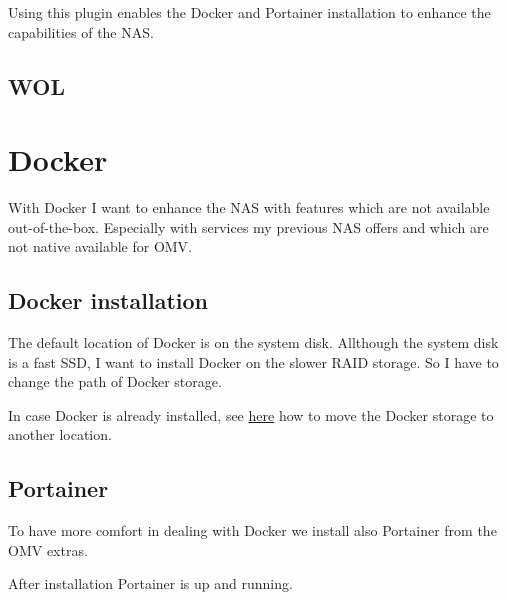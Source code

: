 Using this plugin enables the \gls{Docker} and \gls{Portainer} installation
to enhance the capabilities of the \gls{NAS}.


\subsection{WOL}


\section{Docker}

With \gls{Docker} I want to enhance the \gls{NAS} with features which are not
available out-of-the-box. Especially with services my previous \gls{NAS} offers
and which are not native available for \gls{OMV}.

\subsection{Docker installation}

The default location of \gls{Docker} is  on the
system disk. Allthough the system disk is a fast SSD, I want to install
\gls{Docker} on the slower RAID storage. So I have to change the path of
\gls{Docker} storage.


In case \gls{Docker} is already installed, see \href{https://www.reddit.com/r/OpenMediaVault/comments/fl40gf/moving_docker_storage/}{here}
how to move the \gls{Docker} storage to another location.

\subsection{Portainer}

To have more comfort in dealing with \gls{Docker} we install also \gls{Portainer}
from the \gls{OMV} extras.


After installation \gls{Portainer} is up and running.


